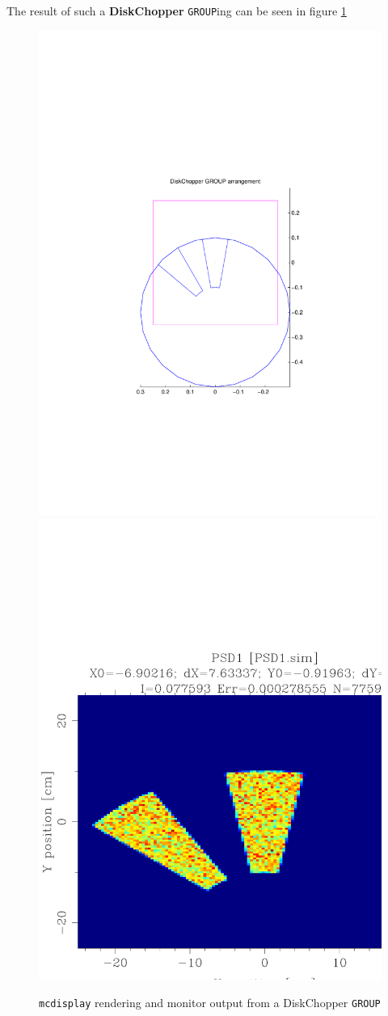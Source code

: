 The result of such a \textbf{DiskChopper} \texttt{GROUP}ing can be seen in
figure \ref{f:chopper2}

\begin{figure}[ht]
\includegraphics[width=0.4\linewidth]{figures/DiskChopperGroup}
\includegraphics[width=0.4\linewidth]{figures/DiskChopperPSD}
\caption{\texttt{mcdisplay} rendering and monitor output from a DiskChopper \texttt{GROUP}}
\label{f:chopper2}
\end{figure}
